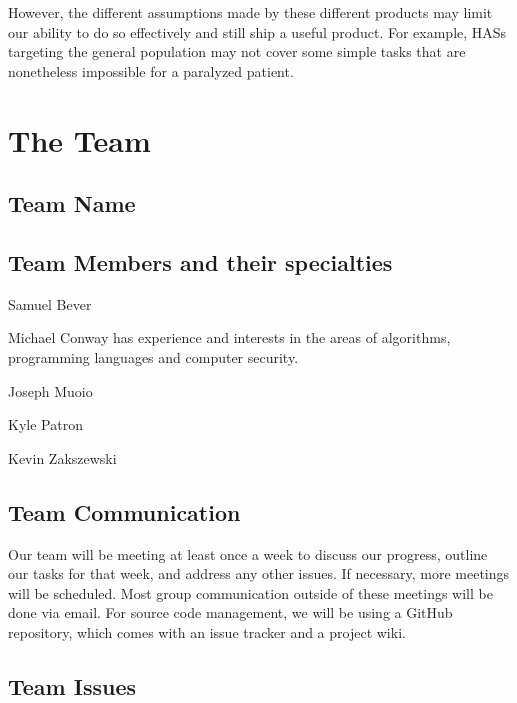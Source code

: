 \documentclass{report}
\begin{document}
However, the different assumptions made by these different products may limit
our ability to do so effectively and still ship a useful product. For example,
HASs targeting the general population may not cover some simple tasks that are
nonetheless impossible for a paralyzed patient.

\newpage
\section*{\centering The Team}

\subsection*{Team Name}


\subsection*{Team Members and their specialties}

Samuel Bever

Michael Conway has experience and interests in the areas of algorithms,
programming languages and computer security. %

Joseph Muoio

Kyle Patron

Kevin Zakszewski



\subsection*{Team Communication}

Our team will be meeting at least once a week to discuss our progress, outline
our tasks for that week, and address any other issues. If necessary, more
meetings will be scheduled. Most group communication outside of these meetings
will be done via email. For source code management, we will be using a GitHub
repository, which comes with an issue tracker and a project wiki.

\subsection*{Team Issues}

\end{document}
